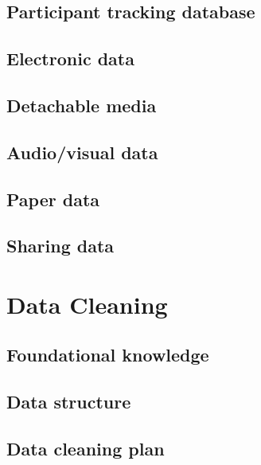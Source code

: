 \documentclass[
]{book}
\begin{document}
\hypertarget{participant-tracking-database}{%
\section{Participant tracking database}\label{participant-tracking-database}}

\hypertarget{electronic-data}{%
\section{Electronic data}\label{electronic-data}}

\hypertarget{detachable-media}{%
\section{Detachable media}\label{detachable-media}}

\hypertarget{audiovisual-data}{%
\section{Audio/visual data}\label{audiovisual-data}}

\hypertarget{paper-data}{%
\section{Paper data}\label{paper-data}}

\hypertarget{sharing-data}{%
\section{Sharing data}\label{sharing-data}}

\hypertarget{data-cleaning}{%
\chapter{Data Cleaning}\label{data-cleaning}}

\hypertarget{foundational-knowledge}{%
\section{Foundational knowledge}\label{foundational-knowledge}}

\hypertarget{data-structure-1}{%
\section{Data structure}\label{data-structure-1}}

\hypertarget{data-cleaning-plan}{%
\section{Data cleaning plan}\label{data-cleaning-plan}}
\end{document}
